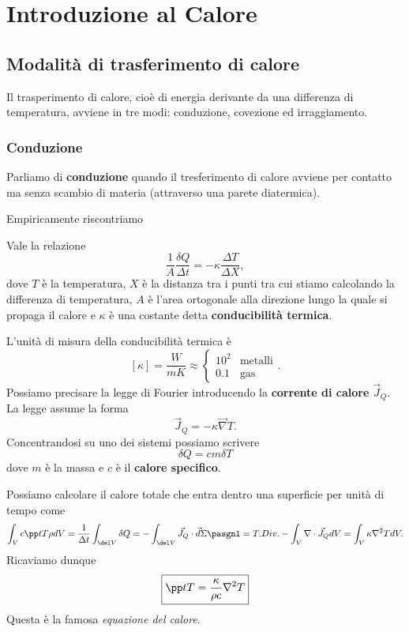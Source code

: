 \chapter{Introduzione al Calore}




\section{Modalit\`a di trasferimento di calore}
Il trasperimento di calore, cio\`e di energia derivante da una differenza di temperatura, avviene in tre modi: conduzione, covezione ed irraggiamento.

\subsection{Conduzione}
Parliamo di \textbf{conduzione} quando il tresferimento di calore avviene per contatto ma senza scambio di materia (attraverso una parete diatermica).\medskip

\noindent Empiricamente riscontriamo
\begin{fact}
Vale la relazione
\[\frac1A\frac{\delta Q}{\Delta t}=-\kappa\frac{\Delta T}{\Delta X},\]
dove $T$ \`e la temperatura, $X$ \`e la distanza tra i punti tra cui stiamo calcolando la differenza di temperatura, $A$ \`e l'area ortogonale alla direzione lungo la quale si propaga il calore e $\kappa$ \`e una costante detta \textbf{conducibilit\`a termica}.
\end{fact}

\noindent L'unit\`a di misura della conducibilit\`a termica \`e
\[[\kappa]=\frac W{mK}\approx \begin{cases}
10^2 &\text{metalli}\\
0.1 &\text{gas}
\end{cases}.\]
\noindent Possiamo precisare la legge di Fourier introducendo la
\textbf{corrente di calore} $\vec J_Q$. La legge assume la forma
\[\vec J_Q=-\kappa\vec \nabla T.\]
Concentrandosi su uno dei sistemi possiamo scrivere
\[\boxed{\delta Q= cm\delta T}\]
dove $m$ \`e la massa e $c$ \`e il \textbf{calore specifico}.\bigskip

\noindent Possiamo calcolare il calore totale che entra dentro una superficie per unit\`a di tempo come
\[\int_V c\pp tT\rho dV=\frac1{\Delta t}\int_{\del V} \delta Q=-\int_{\del V} \vec J_Q\cdot \vec d\Sigma\pasgnl={T.Div.}-\int_V \nabla \cdot \vec J_Q dV=\int_V\kappa\nabla^2 T dV.\]
Ricaviamo dunque
\[\boxed{\pp tT=\frac{\kappa}{\rho c}\nabla^2T}\]
Questa \`e la famosa \textit{equazione del calore}.

